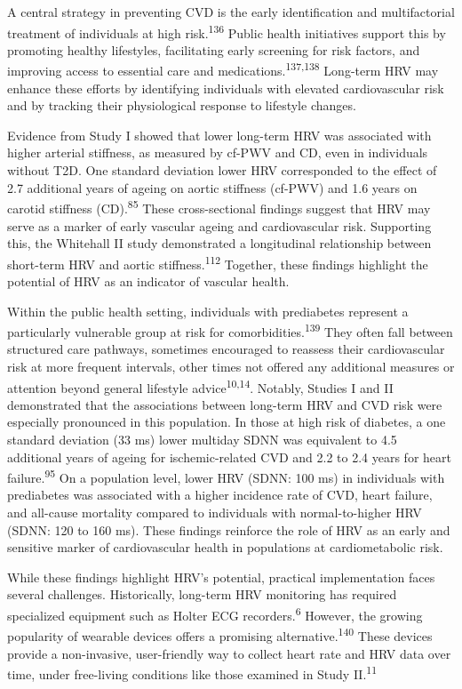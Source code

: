 \documentclass[
  a4paper,
  headsepline=true,
  open=left]{scrbook}
\begin{document}
A central strategy in preventing CVD is the early identification and
multifactorial treatment of individuals at high
risk.\textsuperscript{136} Public health initiatives support this by
promoting healthy lifestyles, facilitating early screening for risk
factors, and improving access to essential care and
medications.\textsuperscript{137,138} Long-term HRV may enhance these
efforts by identifying individuals with elevated cardiovascular risk and
by tracking their physiological response to lifestyle changes.

Evidence from Study I showed that lower long-term HRV was associated
with higher arterial stiffness, as measured by cf-PWV and CD, even in
individuals without T2D. One standard deviation lower HRV corresponded
to the effect of 2.7 additional years of ageing on aortic stiffness
(cf-PWV) and 1.6 years on carotid stiffness (CD).\textsuperscript{85}
These cross-sectional findings suggest that HRV may serve as a marker of
early vascular ageing and cardiovascular risk. Supporting this, the
Whitehall II study demonstrated a longitudinal relationship between
short-term HRV and aortic stiffness.\textsuperscript{112} Together,
these findings highlight the potential of HRV as an indicator of
vascular health.

Within the public health setting, individuals with prediabetes represent
a particularly vulnerable group at risk for
comorbidities.\textsuperscript{139} They often fall between structured
care pathways, sometimes encouraged to reassess their cardiovascular
risk at more frequent intervals, other times not offered any additional
measures or attention beyond general lifestyle
advice\textsuperscript{10,14}. Notably, Studies I and II demonstrated
that the associations between long-term HRV and CVD risk were especially
pronounced in this population. In those at high risk of diabetes, a one
standard deviation (33 ms) lower multiday SDNN was equivalent to 4.5
additional years of ageing for ischemic-related CVD and 2.2 to 2.4 years
for heart failure.\textsuperscript{95} On a population level, lower HRV
(SDNN: 100 ms) in individuals with prediabetes was associated with a
higher incidence rate of CVD, heart failure, and all-cause mortality
compared to individuals with normal-to-higher HRV (SDNN: 120 to 160 ms).
These findings reinforce the role of HRV as an early and sensitive
marker of cardiovascular health in populations at cardiometabolic risk.

While these findings highlight HRV's potential, practical implementation
faces several challenges. Historically, long-term HRV monitoring has
required specialized equipment such as Holter ECG
recorders.\textsuperscript{6} However, the growing popularity of
wearable devices offers a promising alternative.\textsuperscript{140}
These devices provide a non-invasive, user-friendly way to collect heart
rate and HRV data over time, under free-living conditions like those
examined in Study II.\textsuperscript{11}
\end{document}
